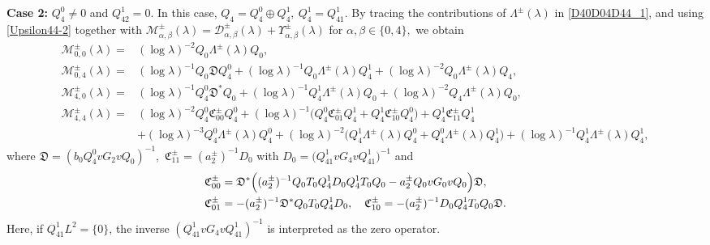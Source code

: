 \documentclass[reqno]{amsart}
\numberwithin{equation}{section}
\begin{document}
\textbf{Case 2:}  $Q_4^0\neq0$ and $Q_{42}^1=0.$ In this case,
$
Q_4
=
Q_4^0\oplus Q_4^1,\ 
Q_4^1=Q_{41}^1.
$
By tracing the contributions of $\Lambda^\pm(\lambda)$ in \eqref{D40D04D44_1}, and using \eqref{Upsilon44-2} together with  $
\mathcal M_{\alpha,\beta}^\pm(\lambda)=\mathcal D_{\alpha,\beta}^\pm(\lambda)+\Upsilon_{\alpha,\beta}^\pm(\lambda)
$ for $\alpha,\beta \in \{0,4\},$  we obtain
\begin{align*}
	\mathcal{M}_{0,0}^\pm(\lambda)=&(\log \lambda)^{-2}  Q_0 \Lambda^\pm(\lambda) Q_0,\\
	\mathcal{M}^\pm_{0,4}(\lambda)=&(\log\lambda)^{-1}Q_0\mathfrak{D}Q_4^0+(\log\lambda)^{-1}Q_0\Lambda^\pm(\lambda)Q_4^1+(\log\lambda)^{-2}Q_0\Lambda^\pm(\lambda)Q_4,\\
	\mathcal{M}^\pm_{4,0}(\lambda)=&(\log\lambda)^{-1}Q_4^0\mathfrak{D}^*Q_0+(\log\lambda)^{-1}Q_4^1\Lambda^\pm(\lambda)Q_0+(\log\lambda)^{-2}Q_4\Lambda^\pm(\lambda)Q_0,\\
	\mathcal{M}^\pm_{4,4}(\lambda)=&(\log\lambda)^{-2}Q_4^0\mathfrak{C}_{00}^\pm Q_4^0+(\log\lambda)^{-1}\bigl(Q_4^0\mathfrak{C}_{01}^\pm Q_4^1+Q_4^1\mathfrak{C}_{10}^\pm Q_4^0\bigr)+Q_4^1\mathfrak{C}_{11}^\pm Q_4^1\\&+(\log\lambda)^{-3}Q_4^0\Lambda^\pm(\lambda)Q_4^0+(\log\lambda)^{-2}\bigl(Q_4^1\Lambda^\pm(\lambda)Q_4^0+Q_4^0\Lambda^\pm(\lambda)Q_4^1\bigr)+(\log\lambda)^{-1}Q_4^1\Lambda^\pm(\lambda)Q_4^1,
\end{align*}
where $\mathfrak{D}=(b_0Q_4^0vG_2vQ_0)^{-1},$ $\mathfrak{C}^\pm_{11}=(a_2^{\pm})^{-1}D_0$ with $D_0=\bigl(Q_{41}^1vG_4vQ_{41}^1\bigr)^{-1}$ and 
\begin{align*}
	\mathfrak{C}^\pm_{00}&=\mathfrak{D}^*	\Bigl((a_2^{\pm})^{-1}
	Q_0T_0Q_4^1D_0Q_4^1T_0Q_0
	-a_2^{\pm}Q_0vG_0vQ_0
	\Bigr)\mathfrak{D},\\
	\mathfrak{C}^\pm_{01}&=-(a_2^{\pm})^{-1}\mathfrak{D}^*Q_0T_0Q_4^1D_0,\quad 	\mathfrak{C}^\pm_{10}=-(a_2^{\pm})^{-1}D_0Q_4^1T_0Q_0\mathfrak{D}.
\end{align*}
Here,  if $Q_{41}^1L^2=\{0\}$, the inverse $(Q_{41}^1 v G_4 v Q_{41}^1)^{-1}$ is interpreted as the zero operator.
\end{document}
